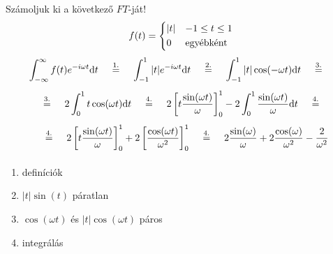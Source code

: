 \feladat Számoljuk ki a következő \fv{}$FT$-ját!
\begin{equation*}
f(t) =
   \begin{cases*}
      \vert t \vert & $-1 \le t \le 1$\\
      0        & egyébként
   \end{cases*}
\end{equation*}
\begin{gather*}
\mhint{-\infty}{\infty}{f(t) e^{-i\omega t}}{t} \opover{1.}{=}
\mhint{-1}{1}{\vert t \vert e^{-i\omega t}}{t} \opover{2.}{=}
\mhint{-1}{1}{\vert t\vert \cos(-\omega t)}{t} \opover{3.}{=}\us
\opover{3.}{=} 2\mhint{0}{1}{t \cos(\omega t)}{t} \opover{4.}{=}
2\mhpfv{0}{1}{t \frac{\sin(\omega t)}{\omega}}-
2\mhint{0}{1}{\frac{\sin(\omega t)}{\omega}}{t} \opover{4.}{=}\us
\opover{4.}{=} 2\mhpfv{0}{1}{t \frac{\sin(\omega t)}{\omega}}+
2\mhpfv{0}{1}{\frac{\cos(\omega t)}{\omega^2}} \opover{4.}{=}
2\frac{\sin(\omega)}{\omega}+2\frac{\cos(\omega)}{\omega^2}-\frac{2}{\omega^2}
\us
\end{gather*}
\magy
\begin{enumerate}
\item definíciók
\item $\vert t\vert\sin(t)$ \kh páratlan
\item $\cos(\omega t)$ és $\vert t\vert \cos(\omega t)$ \kh páros
\item integrálás
\end{enumerate}

